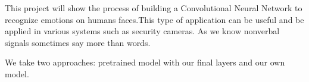 This project will show the process of building a Convolutional Neural Network to recognize emotions on humans faces.This type of application can be useful and be applied in various systems such as security cameras.
As we know nonverbal signals sometimes say more than words.

We take two approaches: pretrained model with our final layers and our own model.
